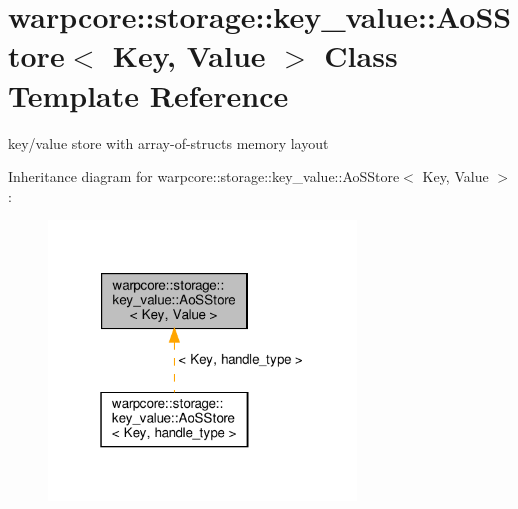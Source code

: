 \hypertarget{classwarpcore_1_1storage_1_1key__value_1_1AoSStore}{}\section{warpcore\+:\+:storage\+:\+:key\+\_\+value\+:\+:Ao\+S\+Store$<$ Key, Value $>$ Class Template Reference}
\label{classwarpcore_1_1storage_1_1key__value_1_1AoSStore}


key/value store with array-\/of-\/structs memory layout  




Inheritance diagram for warpcore\+:\+:storage\+:\+:key\+\_\+value\+:\+:Ao\+S\+Store$<$ Key, Value $>$\+:
\nopagebreak
\begin{figure}[H]
\begin{center}
\leavevmode
\includegraphics[width=232pt]{classwarpcore_1_1storage_1_1key__value_1_1AoSStore__inherit__graph}
\end{center}
\end{figure}
